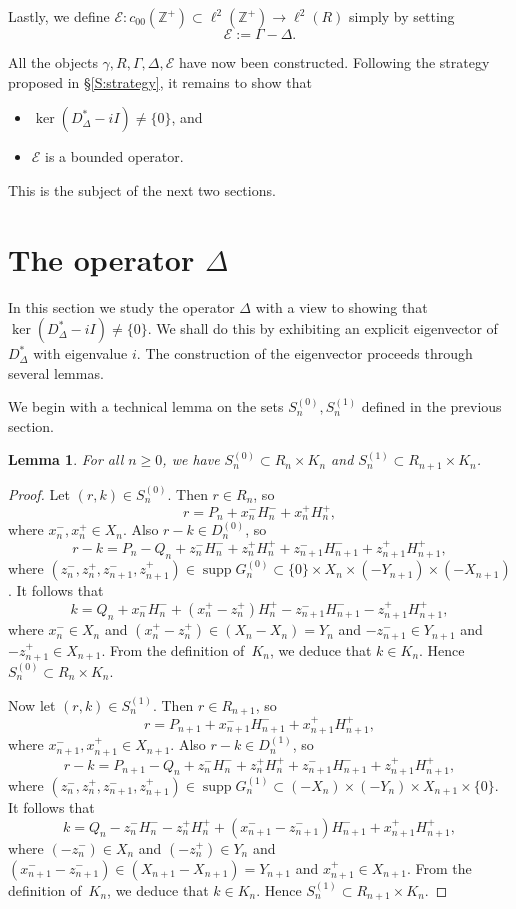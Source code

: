 \documentclass[11pt,reqno]{amsart}
\theoremstyle{plain}
\newtheorem{lemma}[theorem]{Lemma}
\theoremstyle{definition}
\theoremstyle{remark}
\newcommand{\cE}{\mathcal{E}}
\newcommand{\ZZ}{\mathbb{Z}}
\DeclareMathOperator{\supp}{supp}
\begin{document}
Lastly, we define $\cE:c_{00}(\ZZ^+)\subset\ell^2(\ZZ^+)\to\ell^2(R)$ simply by setting
\[
\cE:=\Gamma-\Delta.
\]

All the objects $\gamma,R,\Gamma,\Delta,\cE$ have now been constructed.
Following the strategy proposed in \S\ref{S:strategy}, it remains
to show that
\begin{itemize}
\item $\ker(D_\Delta^*-iI)\ne\{0\}$, and
\item $\cE$ is a bounded operator.
\end{itemize}
This is the subject of the next two sections.



\section{The operator $\Delta$}


In this section we  study the operator $\Delta$
with a view to showing that 
$\ker(D_\Delta^*-iI)\ne\{0\}$.
We shall do this by exhibiting an explicit
eigenvector of $D_\Delta^*$ with eigenvalue $i$.
The construction of the eigenvector proceeds through several  lemmas.

We begin with a technical lemma on the sets $S_n^{(0)},S_n^{(1)}$
defined in the previous section.

\begin{lemma}\label{L:saturation}
For all $n\ge0$, we have
$S_n^{(0)}\subset R_n\times K_n$
and $S_n^{(1)}\subset R_{n+1}\times K_n$.
\end{lemma}

\begin{proof}
Let $(r,k)\in S_n^{(0)}$. Then $r\in R_n$, so
\[
r=P_n+x_n^-H_n^-+x_n^+H_n^+,
\]
where $x_n^-,x_n^+\in X_n$. Also $r-k\in D_n^{(0)}$, so
\[
r-k=P_n-Q_n+z_n^-H_n^-+z_n^+H_n^++z_{n+1}^-H_{n+1}^-+z_{n+1}^+H_{n+1}^+,
\]
where $(z_n^-,z_n^+,z_{n+1}^-,z_{n+1}^+)\in \supp G_n^{(0)}\subset\{0\}\times X_n\times (-Y_{n+1})\times(-X_{n+1})$.
It follows that
\[
k = Q_n+x_n^-H_n^-+(x_n^+-z_n^+)H_n^+-z_{n+1}^-H_{n+1}^--z_{n+1}^+H_{n+1}^+,
\]
where $x_n^-\in X_n$ and $(x_n^+-z_n^+)\in (X_n-X_n)=Y_n$ and $-z_{n+1}^-\in Y_{n+1}$ and $-z_{n+1}^+\in X_{n+1}$. From the definition of~$K_n$,
we deduce that $k\in K_n$. Hence $S_n^{(0)}\subset R_n\times K_n$.

Now let $(r,k)\in S_n^{(1)}$. Then $r\in R_{n+1}$, so
\[
r=P_{n+1}+x_{n+1}^-H_{n+1}^-+x_{n+1}^+H_{n+1}^+,
\]
where $x_{n+1}^-,x_{n+1}^+\in X_{n+1}$. Also $r-k\in D_n^{(1)}$, so
\[
r-k=P_{n+1}-Q_n+z_n^-H_n^-+z_n^+H_n^++z_{n+1}^-H_{n+1}^-+z_{n+1}^+H_{n+1}^+,
\]
where $(z_n^-,z_n^+,z_{n+1}^-,z_{n+1}^+)\in \supp G_n^{(1)}\subset (-X_n)\times(-Y_n)\times X_{n+1}\times\{0\}$.
It follows that
\[
k = Q_n-z_n^-H_n^--z_n^+H_n^++(x_{n+1}^--z_{n+1}^-)H_{n+1}^-+x_{n+1}^+H_{n+1}^+,
\]
where $(-z_n^-)\in X_n$ and $(-z_n^+)\in Y_n$ and $(x_{n+1}^--z_{n+1}^-)\in (X_{n+1}-X_{n+1})=Y_{n+1}$ and $x_{n+1}^+\in X_{n+1}$. From the definition of~$K_n$,
we deduce that $k\in K_n$. Hence $S_n^{(1)}\subset R_{n+1}\times K_n$.
\end{proof}
\end{document}
